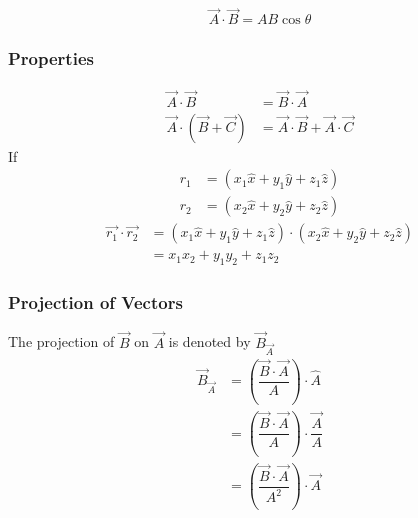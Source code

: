 \documentclass[fleqn]{article}
\begin{document}

\begin{equation*}
	\overrightarrow{A} \cdot \overrightarrow{B} = A B \cos \theta
\end{equation*}

\subsubsection{Properties}

\begin{align*}
	\overrightarrow{A} \cdot \overrightarrow{B} &= \overrightarrow{B} \cdot \overrightarrow{A}\\
	\overrightarrow{A} \cdot (\overrightarrow{B} + \overrightarrow{C}) &= \overrightarrow{A} \cdot \overrightarrow{B} + \overrightarrow{A} \cdot \overrightarrow{C}
\end{align*}
If 
\begin{align*}
	r_1 &= (x_1 \hat{x} + y_1 \hat{y} + z_1 \hat{z})\\
	r_2 &= (x_2 \hat{x} + y_2 \hat{y} + z_2 \hat{z})
\end{align*}
\begin{align*}
	\overrightarrow{r_1} \cdot \overrightarrow{r_2} &= (x_1 \hat{x} + y_1 \hat{y} + z_1 \hat{z}) \cdot (x_2 \hat{x} + y_2 \hat{y} + z_2 \hat{z})\\
	&= x_1 x_2 + y_1 y_2 + z_1 z_2
\end{align*}

\subsubsection{Projection of Vectors}

The projection of $\overrightarrow{B}$ on $\overrightarrow{A}$ is denoted by $\overrightarrow{B}_{\overrightarrow{A}} $
\begin{align*}
	\overrightarrow{B}_{\overrightarrow{A}} &= \left(\dfrac{\overrightarrow{B} \cdot \overrightarrow{A}}{A}\right) \cdot \hat{A}\\
	&= \left(\dfrac{\overrightarrow{B} \cdot \overrightarrow{A}}{A}\right) \cdot \dfrac{\overrightarrow{A}}{A}\\ 
	&= \left(\dfrac{\overrightarrow{B} \cdot \overrightarrow{A}}{A^2}\right) \cdot \overrightarrow{A}
\end{align*}
\end{document}

